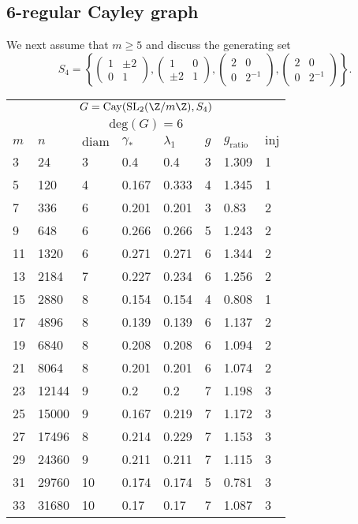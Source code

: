 \newpage

\subsection{6-regular Cayley graph}

We next assume that $m \geq 5$ and discuss the generating set $$S_4 =  \left\{ \begin{pmatrix}
1 & \pm 2 \\ 0 & 1 
\end{pmatrix}, \begin{pmatrix}
1 & 0 \\ \pm 2 & 1 
\end{pmatrix} , \begin{pmatrix}
2 & 0 \\ 0 & 2^{-1} 
\end{pmatrix}, \begin{pmatrix}
2 & 0 \\ 0 & 2^{-1} 
\end{pmatrix} \right\}.$$

\begin{center}
	\begin{tabular}{ p{1cm}|p{1cm}|p{1cm}|p{1cm}|p{1cm}|p{1cm}|p{1cm}|p{1cm} }
		\multicolumn{8}{c}{$G = \mathrm{Cay}(\mathrm{SL}_2(\Z/m\Z),S_4)$} \\
		\multicolumn{8}{c}{$\mathrm{deg}(G) = 6$} \\
		\hline
		$m$ & $n$ &  $\mathrm{diam}$ & $\gamma_*$ &  $\lambda_1$ & $g$ & $g_{\mathrm{ratio}}$ & $\mathrm{inj}$     \\
		\hline
		3 & 24 & 3 &  0.4 & 0.4 & 3 & 1.309 & 1 \\
		5 & 120 & 4 &  0.167 & 0.333 & 4 & 1.345 & 1 \\
		7 & 336 & 6 &  0.201 & 0.201 & 3 & 0.83 & 2 \\
		9 & 648 & 6 &  0.266 & 0.266 & 5 & 1.243 & 2 \\
		11 & 1320 & 6 &  0.271 & 0.271 & 6 & 1.344 & 2 \\
		13 & 2184 & 7 &  0.227 & 0.234 & 6 & 1.256 & 2 \\
		15 & 2880 & 8 &  0.154 & 0.154 & 4 & 0.808 & 1 \\
		17 & 4896 & 8 &  0.139 & 0.139 & 6 & 1.137 & 2 \\
		19 & 6840 & 8 &  0.208 & 0.208 & 6 & 1.094 & 2 \\
		21 & 8064 & 8 &  0.201 & 0.201 & 6 & 1.074 & 2 \\
		23 & 12144 & 9 &  0.2 & 0.2 & 7 & 1.198 & 3 \\
		25 & 15000 & 9 &  0.167 & 0.219 & 7 & 1.172 & 3 \\
		27 & 17496 & 8 &  0.214 & 0.229 & 7 & 1.153 & 3 \\
		29 & 24360 & 9 &  0.211 & 0.211 & 7 & 1.115 & 3 \\
		31 & 29760 & 10 &  0.174 & 0.174 & 5 & 0.781 & 3 \\
		33 & 31680 & 10 &  0.17 & 0.17 & 7 & 1.087 & 3 \\
	\end{tabular}
\end{center}


